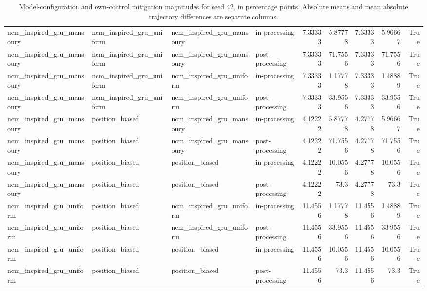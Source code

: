 \begin{table}[htbp!]
\begin{tabular}{llllrrrrr}
ncm\_inspired\_gru\_mansoury & ncm\_inspired\_gru\_uniform & ncm\_inspired\_gru\_mansoury & in-processing & 7.33333 & 5.87778 & 7.33333 & 5.96667 & True \\
ncm\_inspired\_gru\_mansoury & ncm\_inspired\_gru\_uniform & ncm\_inspired\_gru\_mansoury & post-processing & 7.33333 & 71.7556 & 7.33333 & 71.7556 & True \\
ncm\_inspired\_gru\_mansoury & ncm\_inspired\_gru\_uniform & ncm\_inspired\_gru\_uniform & in-processing & 7.33333 & 1.17778 & 7.33333 & 1.48889 & True \\
ncm\_inspired\_gru\_mansoury & ncm\_inspired\_gru\_uniform & ncm\_inspired\_gru\_uniform & post-processing & 7.33333 & 33.9556 & 7.33333 & 33.9556 & True \\
ncm\_inspired\_gru\_mansoury & position\_biased & ncm\_inspired\_gru\_mansoury & in-processing & 4.12222 & 5.87778 & 4.27778 & 5.96667 & True \\
ncm\_inspired\_gru\_mansoury & position\_biased & ncm\_inspired\_gru\_mansoury & post-processing & 4.12222 & 71.7556 & 4.27778 & 71.7556 & True \\
ncm\_inspired\_gru\_mansoury & position\_biased & position\_biased & in-processing & 4.12222 & 10.0556 & 4.27778 & 10.0556 & True \\
ncm\_inspired\_gru\_mansoury & position\_biased & position\_biased & post-processing & 4.12222 & 73.3 & 4.27778 & 73.3 & True \\
ncm\_inspired\_gru\_uniform & position\_biased & ncm\_inspired\_gru\_uniform & in-processing & 11.4556 & 1.17778 & 11.4556 & 1.48889 & True \\
ncm\_inspired\_gru\_uniform & position\_biased & ncm\_inspired\_gru\_uniform & post-processing & 11.4556 & 33.9556 & 11.4556 & 33.9556 & True \\
ncm\_inspired\_gru\_uniform & position\_biased & position\_biased & in-processing & 11.4556 & 10.0556 & 11.4556 & 10.0556 & True \\
ncm\_inspired\_gru\_uniform & position\_biased & position\_biased & post-processing & 11.4556 & 73.3 & 11.4556 & 73.3 & True \\
\hline
\end{tabular}
\caption{Model-configuration and own-control mitigation magnitudes for seed 42, in percentage points. Absolute means and mean absolute trajectory differences are separate columns.}
\label{chap:results:tab:rq4_model_vs_mitigation_seed_42}
\end{table}
